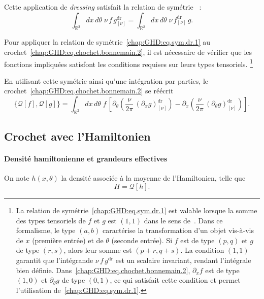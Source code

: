 \medskip

Cette application de \emph{dressing} satisfait la relation de symétrie~\cite{doyon2020lecture} :
\begin{equation}\label{chap:GHD:eq.sym.dr.1}
	\int_{\mathbb{R}^2} dx\, d\theta \; \nu \, f \, g^{\mathrm{dr}}_{[\nu]} 
	= \int_{\mathbb{R}^2} dx\, d\theta \; \nu \, f^{\mathrm{dr}}_{[\nu]} \, g.
\end{equation}

Pour appliquer la relation de symétrie~\eqref{chap:GHD:eq.sym.dr.1} au crochet~\eqref{chap:GHD:eq.chochet.bonnemain.2}, il est nécessaire de vérifier que les fonctions impliquées satisfont les conditions requises sur leurs types tensoriels.
\footnote{
La relation de symétrie~\eqref{chap:GHD:eq.sym.dr.1} est valable lorsque la somme des types tensoriels de $f$ et $g$ est $(1,1)$ dans le sens de~\cite{doyon2020lecture}. Dans ce formalisme, le type $(a,b)$ caractérise la transformation d'un objet vis-à-vis de $x$ (première entrée) et de $\theta$ (seconde entrée). Si $f$ est de type $(p,q)$ et $g$ de type $(r,s)$, alors leur somme est $(p+r,q+s)$. La condition $(1,1)$ garantit que l'intégrande $\nu\, f\, g^{\mathrm{dr}}$ est un scalaire invariant, rendant l'intégrale bien définie. Dans~\eqref{chap:GHD:eq.chochet.bonnemain.2}, $\partial_x f$ est de type $(1,0)$ et $\partial_\theta g$ de type $(0,1)$, ce qui satisfait cette condition et permet l'utilisation de~\eqref{chap:GHD:eq.sym.dr.1}.
}

En utilisant cette symétrie ainsi qu’une intégration par parties, le crochet~\eqref{chap:GHD:eq.chochet.bonnemain.2} se réécrit
\begin{equation}\label{chap:GHD:eq.chochet.bonnemain.3}
	\{\mathcal{Q}[f], \mathcal{Q}[g]\}
	= \int_{\mathbb{R}^2} dx\, d\theta \; f \,
	\left[
		\partial_\theta \left( \frac{\nu}{2\pi} \, (\partial_x g)^{\mathrm{dr}}_{[\nu]} \right)
		- \partial_x \left( \frac{\nu}{2\pi} \, (\partial_\theta g)^{\mathrm{dr}}_{[\nu]} \right)
	\right].
\end{equation}

\medskip

\subsection{Crochet avec l’Hamiltonien}

\paragraph{Densité hamiltonienne et grandeurs effectives} 
On note $h(x,\theta)$ la densité associée à la moyenne de l’Hamiltonien, telle que
\begin{equation}\label{chap:GHD:eq.ham.1}
	H = \mathcal{Q}[h].
\end{equation}

